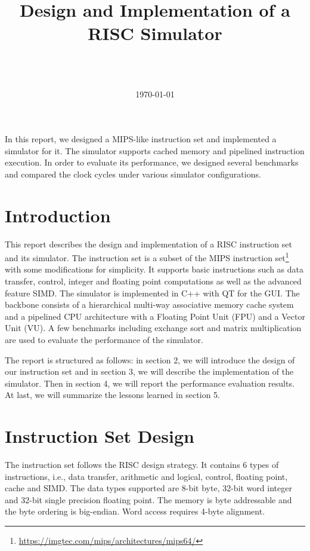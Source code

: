 \documentclass{sig-alternate}
\begin{document}
\title{Design and Implementation of a RISC Simulator}
\author{
\and
{} \\  \\
}

\date{\today}
\maketitle
\abstract
In this report, we designed a MIPS-like instruction set and implemented a simulator for it. The simulator supports cached memory and pipelined instruction execution. In order to evaluate its performance, we designed several benchmarks and compared the clock cycles under various simulator configurations.

\section{Introduction}
This report describes the design and implementation of a RISC instruction set and its simulator. The instruction set is a subset of the MIPS instruction set\footnote{\url{https://imgtec.com/mips/architectures/mips64/}} with some modifications for simplicity. It supports basic instructions such as data transfer, control, integer and floating point computations as well as the advanced feature SIMD. The simulator is implemented in C++ with QT for the GUI. The backbone consists of a hierarchical multi-way associative memory cache system and a pipelined CPU architecture with a Floating Point Unit (FPU) and a Vector Unit (VU). A few benchmarks including exchange sort and matrix multiplication are used to evaluate the performance of the simulator.

The report is structured as follows: in section 2, we will introduce the design of our instruction set and in section 3, we will describe the implementation of the simulator. Then in section 4, we will report the performance evaluation results.  At last, we will summarize the lessons learned in section 5.

\section{Instruction Set Design}
The instruction set follows the RISC design strategy. It contains 6 types of instructions, i.e., data transfer, arithmetic and logical, control, floating point, cache and SIMD. The data types supported are 8-bit byte, 32-bit word integer and 32-bit single precision floating point. The memory is byte addressable and the byte ordering is big-endian. Word access requires 4-byte alignment. 
\end{document}
